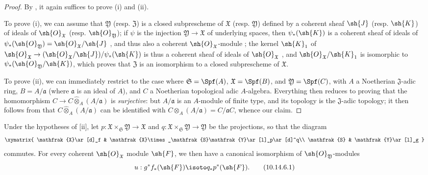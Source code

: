 \begin{proof}
By , it again suffices to prove (i) and (ii).

To prove (i), we can assume that $\mathfrak{Y}$ (resp. $\mathfrak{Z}$) is a closed subprescheme of $\mathfrak{X}$ (resp. $\mathfrak{Y}$) defined by a coherent sheaf $\sh{J}$ (resp. $\sh{K}$) of ideals of $\sh{O}_\mathfrak{X}$ (resp. $\sh{O}_\mathfrak{Y}$);
if $\psi$ is the injection $\mathfrak{Y}\to\mathfrak{X}$ of underlying spaces, then $\psi_*(\sh{K})$ is a coherent sheaf of ideals of $\psi_*(\sh{O}_\mathfrak{Y})=\sh{O}_\mathfrak{X}/\sh{J}$ , and thus also a coherent $\sh{O}_\mathfrak{X}$-module ;
the kernel $\sh{K}_1$ of $\sh{O}_\mathfrak{X}\to(\sh{O}_\mathfrak{X}/\sh{J})/\psi_*(\sh{K})$ is thus a coherent sheaf of ideals of $\sh{O}_\mathfrak{X}$ , and $\sh{O}_\mathfrak{X}/\sh{K}_1$ is isomorphic to $\psi_*(\sh{O}_\mathfrak{Y}/\sh{K})$, which proves that $\mathfrak{Z}$ is an isomorphism to a closed subprescheme of $\mathfrak{X}$.

To prove (ii), we can immediately restrict to the case where $\mathfrak{S}=\Spf(A)$, $\mathfrak{X}=\Spf(B)$, and $\mathfrak{Y}=\Spf(C)$, with $A$ a Noetherian $\mathfrak{J}$-adic ring, $B=A/\mathfrak{a}$ (where $\mathfrak{a}$ is an ideal of $A$), and $C$ a Noetherian topological adic $A$-algebra.
Everything then reduces to proving that the homomorphism $C\to C\widehat{\otimes}_A(A/\mathfrak{a})$ is \emph{surjective}:
but $A/\mathfrak{a}$ is an $A$-module of finite type, and its topology is the $\mathfrak{J}$-adic topology;
it then follows from  that $C\widehat{\otimes}_A(A/\mathfrak{a})$ can be identified with $C\otimes_A(A/\mathfrak{a})=C/\mathfrak{a}C$, whence our claim.
\end{proof}

\begin{corollary}[10.14.6]
\label{I.10.14.6}
Under the hypotheses of [ii], let $p:\mathfrak{X}\times_\mathfrak{S}\mathfrak{Y}\to\mathfrak{X}$ and $q:\mathfrak{X}\times_\mathfrak{S}\mathfrak{Y}\to\mathfrak{Y}$ be the projections, so that the diagram
\[
  \xymatrix{
    \mathfrak{X}\ar[d]_f &
    \mathfrak{X}\times_\mathfrak{S}\mathfrak{Y}\ar[l]_p\ar[d]^q\\
    \mathfrak{S} &
    \mathfrak{Y}\ar[l]_g
  }
\]
commutes.
For every coherent $\sh{O}_\mathfrak{X}$ module $\sh{F}$, we then have a canonical isomorphism of $\sh{O}_\mathfrak{Y}$-modules
\[
\label{I.10.14.6.1}
  u:g^*f_*(\sh{F})\isoto q_*p^*(\sh{F}).
  \tag{10.14.6.1}
\]
\end{corollary}

